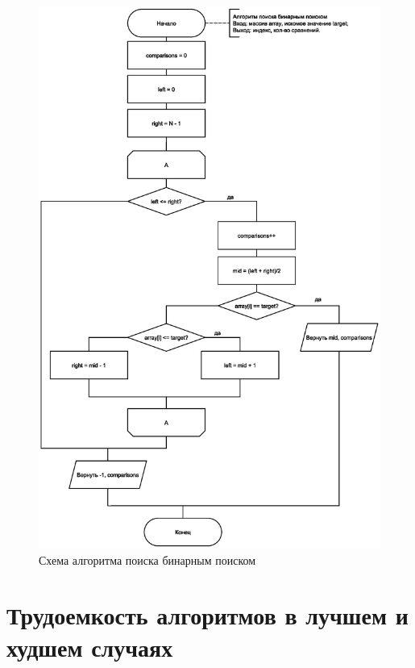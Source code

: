 \begin{figure}[h]
	\centering
	\includegraphics[scale=0.7]{img/binsearch.eps}
	\caption{Схема алгоритма поиска бинарным поиском}
	\label{fig:bin_search}
\end{figure}

\clearpage

\section{Трудоемкость алгоритмов в лучшем и худшем случаях}

